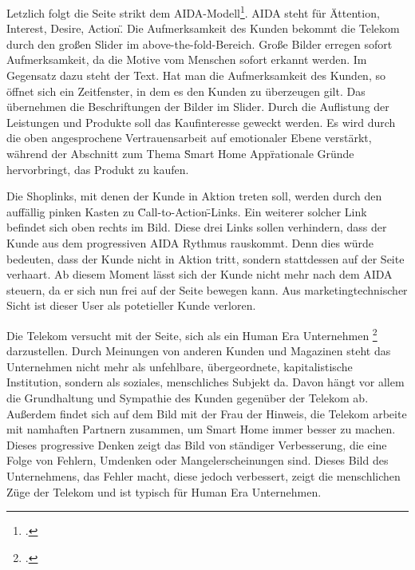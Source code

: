 Letzlich folgt die Seite strikt dem AIDA-Modell\footcite[vgl.][]{AIDA}. AIDA steht für \"Attention, Interest, Desire, Action\". Die Aufmerksamkeit des Kunden bekommt die Telekom durch den großen Slider im above-the-fold-Bereich. Große Bilder erregen sofort Aufmerksamkeit, da die Motive vom Menschen sofort erkannt werden. Im Gegensatz dazu steht der Text. Hat man die Aufmerksamkeit des Kunden, so öffnet sich ein Zeitfenster, in dem es den Kunden zu überzeugen gilt. Das übernehmen die Beschriftungen der Bilder im Slider. Durch die Auflistung der Leistungen und Produkte soll das Kaufinteresse geweckt werden. Es wird durch die oben angesprochene Vertrauensarbeit auf emotionaler Ebene verstärkt, während der Abschnitt zum Thema \"Smart Home App\" rationale Gründe hervorbringt, das Produkt zu kaufen.

Die Shoplinks, mit denen der Kunde in Aktion treten soll, werden durch den auffällig pinken Kasten zu \"Call-to-Action\"-Links. Ein weiterer solcher Link befindet sich oben rechts im Bild. Diese drei Links sollen verhindern, dass der Kunde aus dem progressiven AIDA Rythmus rauskommt. Denn dies würde bedeuten, dass der Kunde nicht in Aktion tritt, sondern stattdessen auf der Seite verhaart. Ab diesem Moment lässt sich der Kunde nicht mehr nach dem AIDA steuern, da er sich nun frei auf der Seite bewegen kann. Aus marketingtechnischer Sicht ist dieser User als potetieller Kunde verloren.

Die Telekom versucht mit der Seite, sich als ein Human Era Unternehmen \footcite[vgl.][]{humanEra} darzustellen. Durch Meinungen von anderen Kunden und Magazinen steht das Unternehmen nicht mehr als unfehlbare, übergeordnete, kapitalistische Institution, sondern als soziales, menschliches Subjekt da. Davon hängt vor allem die Grundhaltung und Sympathie des Kunden gegenüber der Telekom ab. Außerdem findet sich auf dem Bild mit der Frau der Hinweis, die Telekom arbeite mit namhaften Partnern zusammen, um Smart Home immer besser zu machen. Dieses progressive Denken zeigt das Bild von ständiger Verbesserung, die eine Folge von Fehlern, Umdenken oder Mangelerscheinungen sind. Dieses Bild des Unternehmens, das Fehler macht, diese jedoch verbessert, zeigt die menschlichen Züge der Telekom und ist typisch für Human Era Unternehmen.

